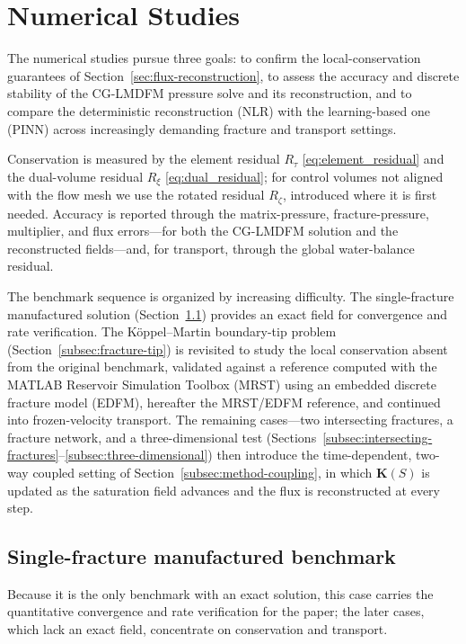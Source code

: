\documentclass[a4paper,fleqn]{cas-sc}
\newcommand{\Kmat}{\mathbf{K}}
\begin{document}
\section{Numerical Studies}
\label{sec:numerical-studies}

The numerical studies pursue three goals: to confirm the local-conservation
guarantees of Section~\ref{sec:flux-reconstruction}, to assess the accuracy and
discrete stability of the CG-LMDFM pressure solve and its reconstruction, and to
compare the deterministic reconstruction (NLR) with the learning-based one (PINN)
across increasingly demanding fracture and transport settings.

Conservation is measured by the element residual \(R_\tau\)
\eqref{eq:element_residual} and the dual-volume residual \(R_\xi\)
\eqref{eq:dual_residual}; for control volumes not aligned with the flow mesh we
use the rotated residual \(R_\zeta\), introduced where it is first needed.
Accuracy is reported through the matrix-pressure, fracture-pressure, multiplier,
and flux errors---for both the CG-LMDFM solution and the reconstructed
fields---and, for transport, through the global water-balance residual.

The benchmark sequence is organized by increasing difficulty. The single-fracture
manufactured solution (Section~\ref{subsec:single-fracture-benchmark}) provides
an exact field for convergence and rate verification. The K\"oppel--Martin
boundary-tip problem (Section~\ref{subsec:fracture-tip}) is revisited to study
the local conservation absent from the original benchmark, validated against
a reference computed with the MATLAB Reservoir Simulation
Toolbox (MRST) using an embedded discrete fracture model (EDFM), hereafter the
MRST/EDFM reference, and continued into frozen-velocity transport.
The remaining cases---two intersecting fractures, a fracture
network, and a three-dimensional test
(Sections~\ref{subsec:intersecting-fractures}--\ref{subsec:three-dimensional})
then introduce the time-dependent, two-way coupled setting of
Section~\ref{subsec:method-coupling}, in which \(\Kmat(S)\) is updated as the
saturation field advances and the flux is reconstructed at every step.

\subsection{Single-fracture manufactured benchmark}
\label{subsec:single-fracture-benchmark}

Because it is the only benchmark with an exact solution, this case carries the
quantitative convergence and rate verification for the paper; the later cases,
which lack an exact field, concentrate on conservation and transport.
\end{document}
